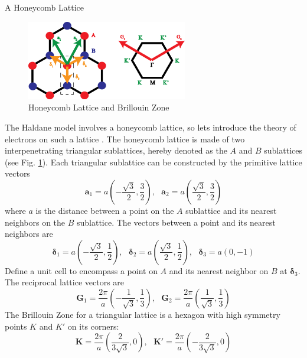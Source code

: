 \documentclass[a4paper,12pt]{article}
\renewcommand{\vec}[1]{\boldsymbol{\mathbf{#1}}}
\begin{document}
\begin{section}{A Honeycomb Lattice}

\begin{figure}[h!]
\centering
\includegraphics[width=70mm,keepaspectratio=true]{honeycomb_primitive_cell.png}
\caption{Honeycomb Lattice and Brillouin Zone}\label{fig:honeycomb}
\end{figure}

The Haldane model involves a honeycomb lattice, so lets introduce the theory of electrons on such a lattice \cite{katsnelson}.  The honeycomb lattice is made of two interpenetrating triangular sublattices, hereby denoted as the $A$ and $B$ sublattices (see Fig. \ref{fig:honeycomb}).  Each triangular sublattice can be constructed by the primitive lattice vectors
\begin{equation}
\vec{a}_1 = a \left( -\frac{\sqrt{3}}{2}, \frac{3}{2} \right), \text{ }
\vec{a}_2 = a \left( \frac{\sqrt{3}}{2}, \frac{3}{2} \right)
\end{equation}
where $a$ is the distance between a point on the $A$ sublattice and its nearest neighbors on the $B$ sublattice.  The vectors between a point and its nearest neighbors are
\begin{equation}
\vec{\delta}_1 = a \left( -\frac{\sqrt{3}}{2}, \frac{1}{2} \right), \text{ }
\vec{\delta}_2 = a \left( \frac{\sqrt{3}}{2}, \frac{1}{2} \right), \text{ }
\vec{\delta}_3 = a \left( 0, -1 \right)
\end{equation}
Define a unit cell to encompass a point on $A$ and its nearest neighbor on $B$ at $\vec{\delta}_3$. The reciprocal lattice vectors are
\begin{equation}
\vec{G}_1 = \frac{2 \pi}{a} \left( -\frac{1}{\sqrt{3}}, \frac{1}{3} \right), \text{ }
\vec{G}_2 = \frac{2 \pi}{a} \left( \frac{1}{\sqrt{3}}, \frac{1}{3} \right)
\end{equation}
The Brillouin Zone for a triangular lattice is a hexagon with high symmetry points $K$ and $K'$ on its corners:
\begin{equation}
\vec{K} = \frac{2 \pi}{a} \left(\frac{2}{3 \sqrt{3}}, 0 \right), \text{ }
\vec{K}' = \frac{2 \pi}{a} \left( -\frac{2}{3 \sqrt{3}}, 0 \right)

\end{equation}
\end{section}
\end{document}
